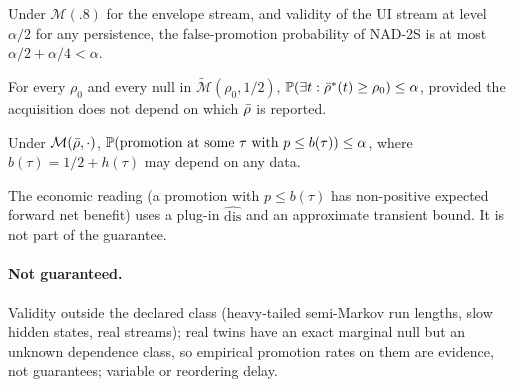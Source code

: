 \begin{proposition}\label{prop:twostream}
Under $\mathcal M(.8)$ for the envelope stream, and validity of the UI stream at level $\alpha/2$
for any persistence, the false-promotion probability of NAD-2S is at most $\alpha/2+\alpha/4<\alpha$.
\end{proposition}

\begin{proposition}\label{prop:rv}
For every $\rho_0$ and every null in $\widetilde{\mathcal M}(\rho_0,1/2)$,
$\mathbb{P}(\exists t:\bar\rho^*(t)\ge\rho_0)\le\alpha$, provided the acquisition does not depend on which
$\bar\rho$ is reported.
\end{proposition}

\begin{proposition}\label{prop:payback}
Under $\mathcal M(\bar\rho,\cdot)$, $\mathbb{P}(\text{promotion at some }\tau\text{ with }p\le b(\tau))\le\alpha$,
where $b(\tau)=1/2+h(\tau)$ may depend on any data.
\end{proposition}
\begin{remark}
The economic reading (a promotion with $p\le b(\tau)$ has non-positive expected forward net benefit)
uses a plug-in $\widehat{\mathrm{dis}}$ and an approximate transient bound. It is not part of the
guarantee.
\end{remark}

\paragraph{Not guaranteed.} Validity outside the declared class (heavy-tailed semi-Markov run
lengths, slow hidden states, real streams); real twins have an exact marginal null but an unknown
dependence class, so empirical promotion rates on them are evidence, not guarantees; variable or
reordering delay.
